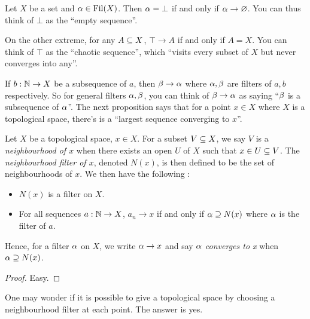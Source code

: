 \documentclass[main.tex]{subfiles}
\begin{document}
\begin{rmk}
  
  Let $X$ be a set and $\alpha \in \operatorname{Fil}(X)$.
  Then $\alpha = \bot$ if and only if $\alpha \to \varnothing$.
  You can thus think of $\bot$ as the ``empty sequence''.

  On the other extreme, for any $A \subseteq X$,
  $\top \to A$ if and only if $A = X$.
  You can think of $\top$ as the ``chaotic sequence'',
  which ``visits every subset of $X$ but never converges into any''.
\end{rmk}

\begin{rmk}
  If $b : \mathbb{N} \to X$ be a subsequence of $a$,
  then $\beta \to \alpha$ where $\alpha,\beta$ are filters of $a,b$ respectively.
  So for general filters $\alpha,\beta$,
  you can think of $\beta \to \alpha$ as saying 
  ``$\beta$ is a subsequence of $\alpha$''.
  The next proposition says that
  for a point $x \in X$ where $X$ is a topological space, 
  there's is a ``largest sequence converging to $x$''.
\end{rmk}

\begin{prop}
  
  Let $X$ be a topological space, $x \in X$. 
  For a subset $V \subseteq X$,
  we say $V$ is a \emph{neighbourhood of $x$} when 
  there exists an open $U$ of $X$ such that 
  $x \in U \subseteq V$.
  The \emph{neighbourhood filter of $x$}, denoted $N(x)$,
  is then defined to be the set of neighbourhoods of $x$.
  We then have the following : 
  \begin{itemize}
    \item $N(x)$ is a filter on $X$.
    \item For all sequences $a : \mathbb{N} \to X$,
    $a_n \to x$ if and only if $\alpha \supseteq N(x)$ where
    $\alpha$ is the filter of $a$.
  \end{itemize}
  Hence, for a filter $\alpha$ on $X$,
  we write $\alpha \to x$ and say \emph{$\alpha$ converges to x} when 
  $\alpha \supseteq N(x)$.
\end{prop}
\begin{proof} 
  Easy. 
\end{proof}

\begin{rmk}
  One may wonder if it is possible to 
  give a topological space by choosing a neighbourhood filter at each point.
  The answer is yes. 
\end{rmk}
\end{document}
